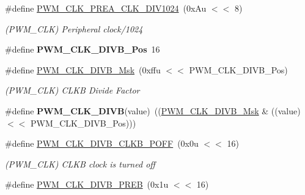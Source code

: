 \begin{DoxyCompactItemize}
\#define \mbox{\hyperlink{group__SAMV71__PWM_ga4ac8af0adc0d5842914af03ef91e93ce}{P\+W\+M\+\_\+\+C\+L\+K\+\_\+\+P\+R\+E\+A\+\_\+\+C\+L\+K\+\_\+\+D\+I\+V1024}}~(0x\+Au $<$$<$ 8)
\begin{DoxyCompactList}\small\item\em (P\+W\+M\+\_\+\+C\+LK) Peripheral clock/1024 \end{DoxyCompactList}\item 
\mbox{\label{group__SAMV71__PWM_ga4ad68719957eb425c8c4dc8c35a891b1}} 
\#define {\bfseries P\+W\+M\+\_\+\+C\+L\+K\+\_\+\+D\+I\+V\+B\+\_\+\+Pos}~16
\item 
\mbox{\label{group__SAMV71__PWM_ga0f10b800816f89c333627527117fdf61}} 
\#define \mbox{\hyperlink{group__SAMV71__PWM_ga0f10b800816f89c333627527117fdf61}{P\+W\+M\+\_\+\+C\+L\+K\+\_\+\+D\+I\+V\+B\+\_\+\+Msk}}~(0xffu $<$$<$ P\+W\+M\+\_\+\+C\+L\+K\+\_\+\+D\+I\+V\+B\+\_\+\+Pos)
\begin{DoxyCompactList}\small\item\em (P\+W\+M\+\_\+\+C\+LK) C\+L\+KB Divide Factor \end{DoxyCompactList}\item 
\mbox{\label{group__SAMV71__PWM_ga78313c3c81971a4d15098efafe65705d}} 
\#define {\bfseries P\+W\+M\+\_\+\+C\+L\+K\+\_\+\+D\+I\+VB}(value)~((\mbox{\hyperlink{group__SAMV71__PWM_ga0f10b800816f89c333627527117fdf61}{P\+W\+M\+\_\+\+C\+L\+K\+\_\+\+D\+I\+V\+B\+\_\+\+Msk}} \& ((value) $<$$<$ P\+W\+M\+\_\+\+C\+L\+K\+\_\+\+D\+I\+V\+B\+\_\+\+Pos)))
\item 
\mbox{\label{group__SAMV71__PWM_gae74dee51491421d03783282b256287e8}} 
\#define \mbox{\hyperlink{group__SAMV71__PWM_gae74dee51491421d03783282b256287e8}{P\+W\+M\+\_\+\+C\+L\+K\+\_\+\+D\+I\+V\+B\+\_\+\+C\+L\+K\+B\+\_\+\+P\+O\+FF}}~(0x0u $<$$<$ 16)
\begin{DoxyCompactList}\small\item\em (P\+W\+M\+\_\+\+C\+LK) C\+L\+KB clock is turned off \end{DoxyCompactList}\item 
\mbox{\label{group__SAMV71__PWM_gaab33aacf0706fdcd8ca7363dc41ad65a}} 
\#define \mbox{\hyperlink{group__SAMV71__PWM_gaab33aacf0706fdcd8ca7363dc41ad65a}{P\+W\+M\+\_\+\+C\+L\+K\+\_\+\+D\+I\+V\+B\+\_\+\+P\+R\+EB}}~(0x1u $<$$<$ 16)
$$
\end{DoxyCompactItemize}
